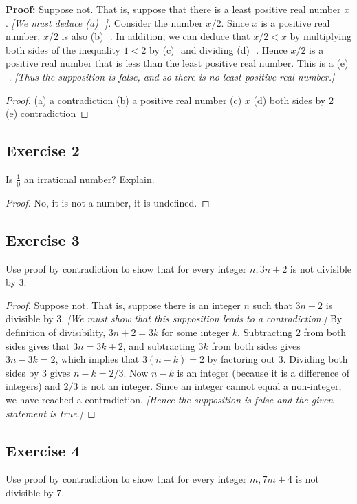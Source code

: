 \documentclass[14pt]{extarticle}
\newcommand{\fbl}{\underline{\hspace{1cm}}\,\,}
\newcommand{\cy}{\color{cyan}}
\begin{document}
{\bf Proof:} Suppose not. That is, suppose that there is a least positive real number $x$. {\it[We must deduce {\cy (a)} \fbl].} Consider the number $x/2$. Since $x$ is a positive real number, $x/2$ is also {\cy (b)} \fbl. In addition, we can deduce that $x/2 < x$ by multiplying both sides of the inequality $1 < 2$ by {\cy (c)} \fbl and dividing {\cy (d)} \fbl. Hence $x/2$ is a positive real number that is less than the least positive real number. This is a {\cy (e)} \fbl. {\it[Thus the supposition is false, and so there is no least positive real number.]}

\begin{proof}
(a) a contradiction
(b) a positive real number
(c) $x$
(d) both sides by 2 \\
(e) contradiction
\end{proof}

\subsection{Exercise 2}
Is $\frac{1}{0}$ an irrational number? Explain.

\begin{proof}
No, it is not a number, it is undefined.
\end{proof}

\subsection{Exercise 3}
Use proof by contradiction to show that for every integer $n, 3n + 2$ is not divisible by 3.

\begin{proof}
Suppose not. That is, suppose there is an integer $n$ such that $3n + 2$ is divisible by 3. {\it [We must show that this supposition leads to a contradiction.]} By definition of divisibility, $3n + 2 = 3k$ for some integer $k$. Subtracting 2 from both sides gives that $3n = 3k + 2$, and subtracting $3k$ from both sides gives $3n - 3k = 2$, which implies that $3(n - k) = 2$ by factoring out 3. Dividing both sides by 3 gives $n - k = 2/3$. Now $n - k$ is an integer (because it is a difference of integers) and $2/3$ is not an integer. Since an integer cannot equal a non-integer, we have reached a contradiction. {\it[Hence the supposition is false and the given statement is true.]}
\end{proof}

\subsection{Exercise 4}
Use proof by contradiction to show that for every integer $m, 7m + 4$ is not divisible by 7. 
\end{document}
